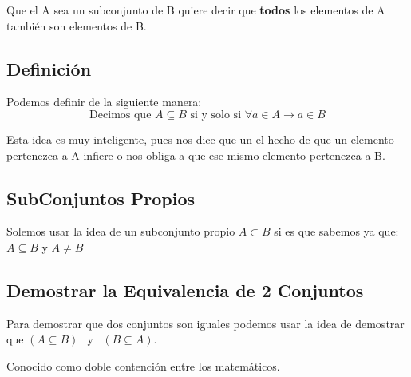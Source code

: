 \documentclass[12pt, fleqn]{report}                             %
\DeclareMathOperator \Space     {\quad}                         %
\DeclareMathOperator \MiniSpace {\;}                            %
\newcommand \Also           {\MiniSpace \text{y} \MiniSpace}    %
\theoremstyle{break}                                            %
\begin{document}
            Que el A sea un subconjunto de B quiere decir que \textbf{todos} los elementos de A
            también son elementos de B.


            \subsection{Definición}

                Podemos definir de la siguiente manera:
                \begin{equation*}
                    \text{Decimos que }
                    A \subseteq B 
                    \text{ si y solo si }
                    \forall a \in A \to a \in B
                \end{equation*}

                Esta idea es muy inteligente, pues nos dice que un el hecho de que
                un elemento pertenezca a A infiere o nos obliga a que ese mismo
                elemento pertenezca a B.

            \subsection{SubConjuntos Propios}

                Solemos usar la idea de un subconjunto propio $A \subset B$ si es que sabemos ya que:
                $A \subseteq B$ y $A \neq B$


            \subsection{Demostrar la Equivalencia de 2 Conjuntos}

                Para demostrar que dos conjuntos son iguales podemos usar la idea de
                demostrar que $(A \subseteq B ) \Also (B \subseteq A)$.

                Conocido como doble contención entre los matemáticos.


            \clearpage
\end{document}
